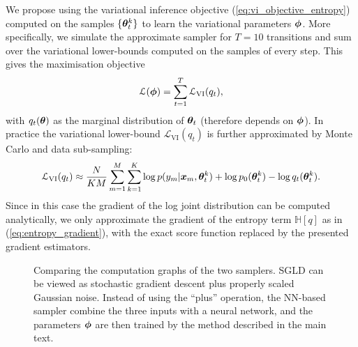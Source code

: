 We propose using the variational inference objective (\ref{eq:vi_objective_entropy}) computed on the samples $\{ \bm{\theta}_t^k \}$ to learn the variational parameters $\bm{\phi}$. 
%
More specifically, we simulate the approximate sampler for $T = 10$ transitions and sum over the variational lower-bounds computed on the samples of every step. This gives the maximisation objective
$$\mathcal{L}(\bm{\phi}) = \sum_{t=1}^T \mathcal{L}_{\text{VI}}(q_t),$$
with $q_t(\bm{\theta})$ as the marginal distribution of $\bm{\theta}_t$ (therefore depends on $\bm{\phi}$). In practice the variational lower-bound $\mathcal{L}_{\text{VI}}(q_t)$ is further approximated by Monte Carlo and data sub-sampling:
$$ \mathcal{L}_{\text{VI}}(q_t) \approx \frac{N}{K M} \sum_{m = 1}^M \sum_{k=1}^K \log p(y_m|\bm{x}_m, \bm{\theta}_t^k) + \log p_0(\bm{\theta}_t^k) - \log q_t(\bm{\theta}_t^k).$$
%
Since in this case the gradient of the log joint distribution can be computed analytically, we only approximate the gradient of the entropy term $\mathbb{H}[q]$ as in (\ref{eq:entropy_gradient}), with the exact score function replaced by the presented gradient estimators. 

\begin{figure}[t]
\hfill
{}
\caption{Comparing the computation graphs of the two samplers. SGLD can be viewed as stochastic gradient descent plus properly scaled Gaussian noise. Instead of using the ``plus'' operation, the NN-based sampler combine the three inputs with a neural network, and the parameters $\bm{\phi}$ are then trained by the method described in the main text.}
\label{fig:sgld_nn_sampler_compare}
\end{figure}

